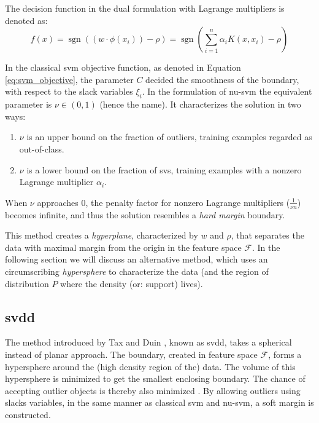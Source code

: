 The decision function in the dual formulation with Lagrange multipliers is denoted as:
\begin{equation}\label{eq:nu-svm_lagrange}
f(x) = \operatorname{sgn}((w \cdot \phi(x_i)) - \rho) = \operatorname{sgn}( \sum_{i=1}^n \alpha_i K(x, x_i) - \rho)
\end{equation}

In the classical \gls{svm} objective function, as denoted in Equation \ref{eq:svm_objective}, the parameter $C$ decided the smoothness of the boundary, with respect to the slack variables $\xi_i$.
In the formulation of \gls{nu-svm} the equivalent parameter is $\nu \in (0,1)$ (hence the name).
It characterizes the solution in two ways:
\begin{enumerate}
  \item $\nu$ is an upper bound on the fraction of outliers, \ie training examples regarded as out-of-class.
  \item $\nu$ is a lower bound on the fraction of \glspl{sv}, \ie training examples with a nonzero Lagrange multiplier $\alpha_i$.
\end{enumerate}
When $\nu$ approaches $0$, the penalty factor for nonzero Lagrange multipliers ($\frac{1}{\nu n}$) becomes infinite, and thus the solution resembles a \emph{hard margin} boundary.

This method creates a \emph{hyperplane}, characterized by $w$ and $\rho$, that separates the data with maximal margin from the origin in the feature space $\mathcal{F}$.
In the following section we will discuss an alternative method, which uses an circumscribing \emph{hypersphere} to characterize the data (and the region of distribution $P$ where the density (or: support) lives).



\subsection{\acrlong{svdd}}\label{subsec:oc-svm-svdd}
The method introduced by Tax and Duin \cite{tax1999support}, known as \acrlong{svdd}, takes a spherical instead of planar approach.
The boundary, created in feature space $\mathcal{F}$, forms a hypersphere around the (high density region of the) data.
The volume of this hypersphere is minimized to get the smallest enclosing boundary.
The chance of accepting outlier objects is thereby also minimized \cite{tax2003online}.
By allowing outliers using slacks variables, in the same manner as classical \gls{svm} and \gls{nu-svm}, a soft margin is constructed.

